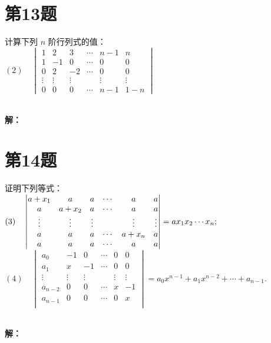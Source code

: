 \documentclass[a4paper, 12pt]{ctexart}
\begin{document}
\section{第13题}
\begin{exercise}
计算下列 $n$ 阶行列式的值：\\


$(2) \quad \begin{vmatrix}
 1 & 2 & 3 & \cdots & n-1 & n\\
 1 & -1 & 0 & \cdots & 0 & 0\\
 0 & 2 & -2 & \cdots & 0 & 0\\
 \vdots & \vdots & \vdots &   &\vdots &\vdots \\
 0 & 0 & 0 & \cdots &n-1 &1-n
\end{vmatrix}$
\end{exercise}~\\
\noindent\textbf{解：}


\section{第14题}
\begin{exercise}
证明下列等式：\\

$(3) \quad \begin{vmatrix}
 a+x_{1}  &a  &a  & \cdots &a  &a \\
 a & a+x_{2}  & a & \cdots  & a & a\\
\vdots & \vdots & \vdots  &  & \vdots & \vdots\\
 a & a & a & \cdots & a+x_{n}  & a \\
  a& a & a & \cdots & a &a\\
  \end{vmatrix}= ax_{1}x _{2} \cdots x_{n} ;\\
$\\

  

$(4) \quad \begin{vmatrix}
a_{0}  & -1 & 0 &  \cdots & 0 & 0\\
 a_{1}  & x & -1 & \cdots &  0& 0\\
\vdots & \vdots & \vdots &  & \vdots & \vdots\\
a_{n-2}  & 0 & 0 & \cdots & x & -1\\
 a_{n-1}  & 0 & 0 & \cdots & 0 & x\\
\end{vmatrix}= a_{0} x^{n-1} +a_{1} x^{n-2} + \cdots +a_{n-1} .
$
\end{exercise}~\\
\noindent\textbf{解：}
\end{document}
